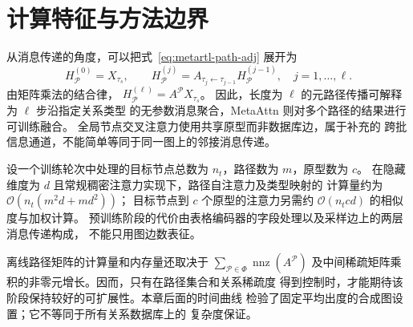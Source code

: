 \section{计算特征与方法边界}
\label{sec:metartl-complexity}

从消息传递的角度，可以把式~\eqref{eq:metartl-path-adj} 展开为
\begin{equation}
  H_{\mathcal P}^{(0)}=X_{\tau_s},\qquad
  H_{\mathcal P}^{(j)}
  =A_{\tau_j\leftarrow\tau_{j-1}}H_{\mathcal P}^{(j-1)},
  \quad j=1,\ldots,\ell.
  \label{eq:metartl-recursion}
\end{equation}
由矩阵乘法的结合律，
$H_{\mathcal P}^{(\ell)}=A^{\mathcal P}X_{\tau_s}$。
因此，长度为 $\ell$ 的元路径传播可解释为 $\ell$ 步沿指定关系类型
的无参数消息聚合，MetaAttn 则对多个路径的结果进行可训练融合。
全局节点交叉注意力使用共享原型而非数据库边，属于补充的
跨批信息通道，不能简单等同于同一图上的邻接消息传递。

设一个训练轮次中处理的目标节点总数为 $n_t$，路径数为 $m$，原型数为 $c$。
在隐藏维度为 $d$ 且常规稠密注意力实现下，路径自注意力及类型映射的
计算量约为
$\mathcal O\!\left(n_t(m^2d+md^2)\right)$；
目标节点到 $c$ 个原型的注意力另需约
$\mathcal O(n_tcd)$ 的相似度与加权计算。
预训练阶段的代价由表格编码器的字段处理以及采样边上的两层消息传递构成，
不能只用图边数表征。

离线路径矩阵的计算量和内存量还取决于
$\sum_{\mathcal P\in\Phi}\operatorname{nnz}(A^{\mathcal P})$
及中间稀疏矩阵乘积的非零元增长。因而，只有在路径集合和关系稀疏度
得到控制时，才能期待该阶段保持较好的可扩展性。本章后面的时间曲线
检验了固定平均出度的合成图设置；它不等同于所有关系数据库上的
复杂度保证。
